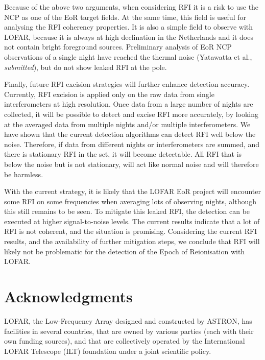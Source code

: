 \documentclass[useAMS,usenatbib]{mn2e}
\begin{document}
Because of the above two arguments, when considering RFI it is a risk to use the NCP as one of the EoR target fields. At the same time, this field is useful for analysing the RFI coherency properties. It is also a simple field to observe with LOFAR, because it is always at high declination in the Netherlands and it does not contain bright foreground sources. Preliminary analysis of EoR NCP observations of a single night have reached the thermal noise (Yatawatta et al., \textit{submitted}), but do not show leaked RFI at the pole.

Finally, future RFI excision strategies will further enhance detection accuracy. Currently, RFI excision is applied only on the raw data from single interferometers at high resolution. Once data from a large number of nights are collected, it will be possible to detect and excise RFI more accurately, by looking at the averaged data from multiple nights and/or multiple interferometers. We have shown that the current detection algorithms can detect RFI well below the noise. Therefore, if data from different nights or interferometers are summed, and there is stationary RFI in the set, it will become detectable. All RFI that is below the noise but is not stationary, will act like normal noise and will therefore be harmless.

With the current strategy, it is likely that the LOFAR EoR project will encounter some RFI on some frequencies when averaging lots of observing nights, although this still remains to be seen. To mitigate this leaked RFI, the detection can be executed at higher signal-to-noise levels. The current results indicate that a lot of RFI is not coherent, and the situation is promising. Considering the current RFI results, and the availability of further mitigation steps, we conclude that RFI will likely not be problematic for the detection of the Epoch of Reionisation with LOFAR.

\label{lastpage}
\section*{Acknowledgments}
LOFAR, the Low-Frequency Array designed and constructed by ASTRON, has facilities in several countries, that are owned by various parties (each with their own funding sources), and that are collectively operated by the International LOFAR Telescope (ILT) foundation under a joint scientific policy.

\appendix
\end{document}
